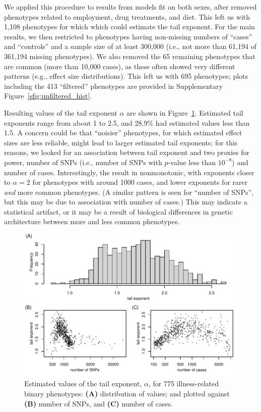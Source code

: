 \documentclass{article}
\theoremstyle{remark}
\theoremstyle{definition}
\begin{document}
We applied this procedure to results from models fit on both sexes,
after removed phenotypes related to employment, drug treatments, and diet.
This left us with 1,108 phenotypes for which which could estimate the tail exponent.
For the main results,
we then restricted to phenotypes having non-missing numbers of ``cases'' and ``controls''
and a sample size of at least 300,000 (i.e., not more than 61,194 of 361,194 missing phenotypes).
We also removed
the 65 remaining phenotypes that are common (more than 10,000 cases),
as these often showed very different patterns
(e.g., effect size distributions).
This left us with 695 phenotypes;
plots including the 413 ``filtered'' phenotypes are provided in
Supplementary Figure~\ref{sfig:unfiltered_hist}.

Resulting values of the tail exponent $\alpha$ are shown in Figure~\ref{fig:exponent_hist}.
Estimated tail exponents range from about 1 to 2.5,
and 28.9\% had estimated values less than 1.5.
A concern could be that ``noisier'' phenotypes,
for which estimated effect sizes are less reliable,
might lead to larger estimated tail exponents;
for this reasons, we looked for an association between
tail exponent and two proxies for power,
number of SNPs (i.e., number of SNPs with $p$-value less than $10^{-8}$)
and number of cases.
Interestingly, the result in nonmonotonic,
with exponents closer to $\alpha=2$ for phenotypes with around 1000 cases,
and lower exponents for rarer \emph{and} more common phenotypes.
(A similar pattern is seen for ``number of SNPs'',
but this may be due to association with number of cases.)
This may indicate a statistical artifact,
or it may be a result of biological differences in genetic architecture
between more and less common phenotypes.

\begin{figure}
    \begin{center}
    \includegraphics{snp_effects/results_10}
    \end{center}
    \caption{
        Estimated values of the tail exponent, $\alpha$,
        for 775 illness-related binary phenotypes:
        \textbf{(A)} distribution of values; and plotted against
        \textbf{(B)} number of SNPs, and
        \textbf{(C)} number of cases.
        \label{fig:exponent_hist}
    }
\end{figure}
\end{document}
